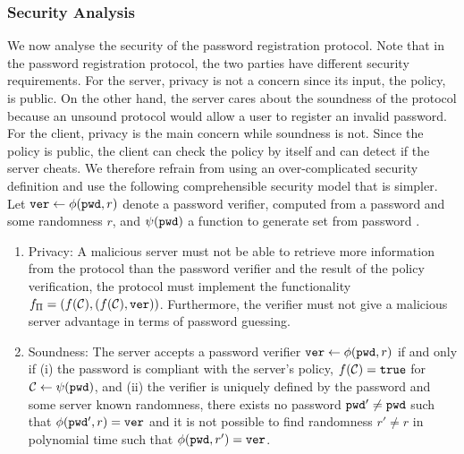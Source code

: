 \subsubsection{Security Analysis} \label{sec:bpr:security}
We now analyse the security of the password registration protocol. Note that in the password registration protocol, the two parties have different security requirements. For the server, privacy is not a concern since its input, the policy, is public. On the other hand, the server cares about the soundness of the protocol because an unsound protocol would allow a user to register an invalid password. For the client, privacy is the main concern while soundness is not. Since the policy is public, the client can check the policy by itself and can detect if the server cheats. 
We therefore refrain from using an over-complicated security definition and use the following comprehensible security model that is simpler. Let $\mathtt{ver}\gets\phi(\mathtt{pwd},r)$ denote a password verifier, computed from a password \pwd and some randomness $r$, and $\psi(\mathtt{pwd})$ a function to generate set \cC from password \pwd.
\begin{enumerate}
  \item Privacy: A malicious server must not be able to retrieve more information from the protocol than the password verifier and the result of the policy verification, \ie the protocol must implement the functionality $f_{\Pi}=(f(\mathcal{C}), (f(\mathcal{C}), \mathtt{ver}))$. Furthermore, the verifier must not give a malicious server advantage in terms of password guessing. 
  \item Soundness: The server accepts a password verifier $\mathtt{ver}\gets\phi(\mathtt{pwd},r)$ if and only if (i) the password is compliant with the server's policy, \ie $f(\mathcal{C})=\mathtt{true}$ for $\mathcal{C}\gets\psi(\mathtt{pwd})$, and (ii) the verifier is uniquely defined by the password and some server known randomness, \ie there exists no password $\mathtt{pwd}'\not=\mathtt{pwd}$ such that $\phi(\mathtt{pwd}',r)=\mathtt{ver}$ and it is not possible to find randomness $r'\not=r$ in polynomial time such that $\phi(\mathtt{pwd},r')=\mathtt{ver}$.
\end{enumerate}


